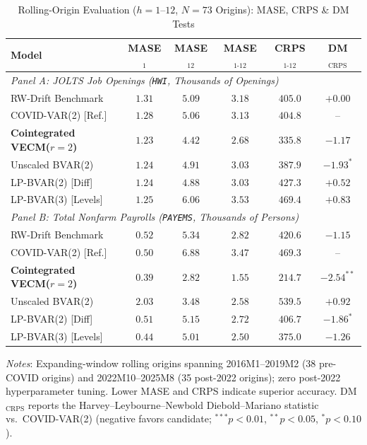 \begin{table}[t]
\centering
\caption{Rolling-Origin Evaluation ($h=1\text{--}12$, $N=73$ Origins): MASE, CRPS \& DM Tests}
\label{tab:rolling_eval}
\begin{minipage}{\columnwidth}
\centering
\fontsize{6.3pt}{7.7pt}\selectfont
\setlength{\tabcolsep}{1.6pt}
\begin{tabular}{lccccc}
\toprule
\textbf{Model} & \textbf{MASE}$_{1}$ & \textbf{MASE}$_{12}$ & \textbf{MASE}$_{\text{1-12}}$ & \textbf{CRPS}$_{\text{1-12}}$ & \textbf{DM}$_{\text{CRPS}}$ \\
\midrule
\multicolumn{6}{l}{\textit{Panel A: JOLTS Job Openings (\texttt{HWI}, Thousands of Openings)}} \\
RW-Drift Benchmark    & $1.31$ & $5.09$ & $3.18$ & $405.0$ & $+0.00$ \\
COVID-VAR(2) [Ref.]   & $1.28$ & $5.06$ & $3.13$ & $404.8$ & -- \\
\textbf{Cointegrated VECM($r=2$)} & $\mathbf{1.23}$ & $\mathbf{4.42}$ & $\mathbf{2.68}$ & $\mathbf{335.8}$ & $\mathbf{-1.17}$ \\
Unscaled BVAR(2)      & $1.24$ & $4.91$ & $3.03$ & $387.9$ & $-1.93^{*}$ \\
LP-BVAR(2) [Diff]     & $1.24$ & $4.88$ & $3.03$ & $427.3$ & $+0.52$ \\
LP-BVAR(3) [Levels]   & $1.25$ & $6.06$ & $3.53$ & $469.4$ & $+0.83$ \\
\midrule
\multicolumn{6}{l}{\textit{Panel B: Total Nonfarm Payrolls (\texttt{PAYEMS}, Thousands of Persons)}} \\
RW-Drift Benchmark    & $0.52$ & $5.34$ & $2.82$ & $420.6$ & $-1.15$ \\
COVID-VAR(2) [Ref.]   & $0.50$ & $6.88$ & $3.47$ & $469.3$ & -- \\
\textbf{Cointegrated VECM($r=2$)} & $\mathbf{0.39}$ & $\mathbf{2.82}$ & $\mathbf{1.55}$ & $\mathbf{214.7}$ & $\mathbf{-2.54^{**}}$ \\
Unscaled BVAR(2)      & $2.03$ & $3.48$ & $2.58$ & $539.5$ & $+0.92$ \\
LP-BVAR(2) [Diff]     & $0.51$ & $5.15$ & $2.72$ & $406.7$ & $-1.86^{*}$ \\
LP-BVAR(3) [Levels]   & $0.44$ & $5.01$ & $2.50$ & $375.0$ & $-1.26$ \\
\bottomrule
\end{tabular}
\vskip 2pt
{\scriptsize \textit{Notes}: Expanding-window rolling origins spanning 2016M1--2019M2 (38 pre-COVID origins) and 2022M10--2025M8 (35 post-2022 origins); zero post-2022 hyperparameter tuning. Lower MASE and CRPS indicate superior accuracy. DM$_{\text{CRPS}}$ reports the Harvey--Leybourne--Newbold Diebold--Mariano statistic vs.\ COVID-VAR(2) (negative favors candidate; $^{***}p<0.01$, $^{**}p<0.05$, $^{*}p<0.10$).\par}
\end{minipage}
\end{table}
